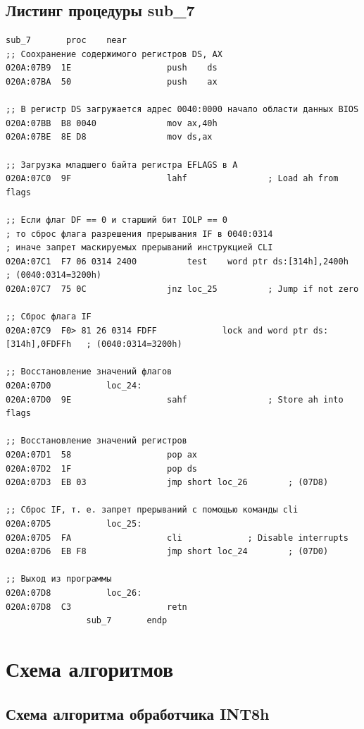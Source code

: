 \documentclass[a4paper,12pt]{article}
\begin{document}
\subsection{Листинг процедуры sub\_7}

\begin{lstlisting}[style={asm}]
				sub_7		proc	near
;; Соохранение содержимого регистров DS, AX
020A:07B9  1E					push	ds
020A:07BA  50					push	ax

;; В регистр DS загружается адрес 0040:0000 начало области данных BIOS
020A:07BB  B8 0040				mov	ax,40h
020A:07BE  8E D8				mov	ds,ax

;; Загрузка младшего байта регистра EFLAGS в A
020A:07C0  9F					lahf				; Load ah from flags

;; Если флаг DF == 0 и старший бит IOLP == 0
; то сброс флага разрешения прерывания IF в 0040:0314
; иначе запрет маскируемых прерываний инструкцией CLI
020A:07C1  F7 06 0314 2400			test	word ptr ds:[314h],2400h	; (0040:0314=3200h)
020A:07C7  75 0C				jnz	loc_25			; Jump if not zero

;; Сброс флага IF
020A:07C9  F0> 81 26 0314 FDFF	           lock	and	word ptr ds:[314h],0FDFFh	; (0040:0314=3200h)

;; Восстановление значений флагов
020A:07D0			loc_24:
020A:07D0  9E					sahf				; Store ah into flags

;; Восстановление значений регистров
020A:07D1  58					pop	ax
020A:07D2  1F					pop	ds
020A:07D3  EB 03				jmp	short loc_26		; (07D8)

;; Сброс IF, т. е. запрет прерываний с помощью команды cli
020A:07D5			loc_25:
020A:07D5  FA					cli				; Disable interrupts
020A:07D6  EB F8				jmp	short loc_24		; (07D0)

;; Выход из программы
020A:07D8			loc_26:
020A:07D8  C3					retn
				sub_7		endp
\end{lstlisting}
\clearpage

\section{Схема алгоритмов}

\subsection{Схема алгоритма обработчика INT8h}
\end{document}
